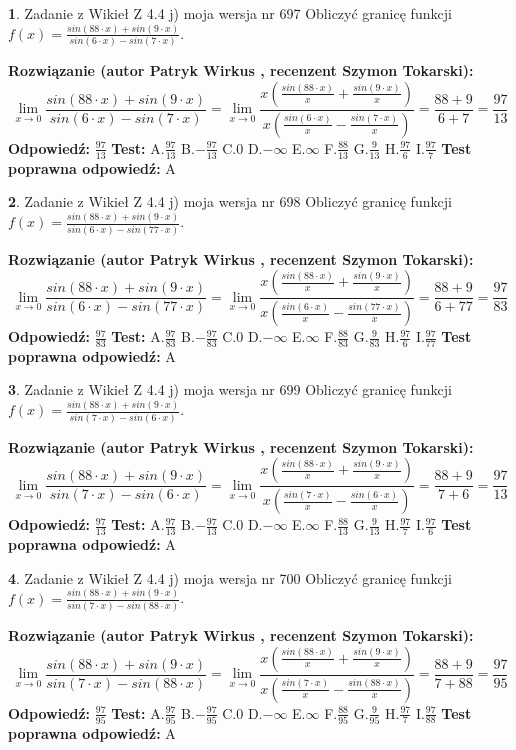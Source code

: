 \documentclass[12pt, a4paper]{article}
\theoremstyle{definition} %
\newtheorem{zad}{}
\newcommand{\zadStart}[1]{\begin{zad}#1\newline}
\newcommand{\zadStop}{\end{zad}}
\newcommand{\rozwStart}[2]{\noindent \textbf{Rozwiązanie (autor #1 , recenzent #2): }\newline}
\newcommand{\rozwStop}{\newline}
\newcommand{\odpStart}{\noindent \textbf{Odpowiedź:}\newline}
\newcommand{\odpStop}{\newline}
\newcommand{\testStart}{\noindent \textbf{Test:}\newline}
\newcommand{\testStop}{\newline}
\newcommand{\kluczStart}{\noindent \textbf{Test poprawna odpowiedź:}\newline}
\newcommand{\kluczStop}{\newline}
\begin{document}
\zadStart{Zadanie z Wikieł Z 4.4 j) moja wersja nr 697}
Obliczyć granicę funkcji $f(x)=\frac{sin(88\cdot x) +sin(9\cdot x)}{sin(6\cdot x) -sin(7\cdot x)}$.
\zadStop
\rozwStart{Patryk Wirkus}{Szymon Tokarski}
$$\lim\limits_{x\to 0}\frac{sin(88\cdot x) +sin(9\cdot x)}{sin(6\cdot x) -sin(7\cdot x)}=\lim\limits_{x\to 0}\frac{x(\frac{sin(88\cdot x)}{x}+\frac{sin(9\cdot x)}{x})}{x(\frac{sin(6\cdot x)}{x}-\frac{sin(7\cdot x)}{x})}=\frac{88+9}{6+7} = \frac{97}{13}$$
\rozwStop
\odpStart
$\frac{97}{13}$
\odpStop
\testStart
A.$\frac{97}{13}$
B.$-\frac{97}{13}$
C.$0$
D.$-\infty$
E.$\infty$
F.$\frac{88}{13}$
G.$\frac{9}{13}$
H.$\frac{97}{6}$
I.$\frac{97}{7}$
\testStop
\kluczStart
A
\kluczStop



\zadStart{Zadanie z Wikieł Z 4.4 j) moja wersja nr 698}
Obliczyć granicę funkcji $f(x)=\frac{sin(88\cdot x) +sin(9\cdot x)}{sin(6\cdot x) -sin(77\cdot x)}$.
\zadStop
\rozwStart{Patryk Wirkus}{Szymon Tokarski}
$$\lim\limits_{x\to 0}\frac{sin(88\cdot x) +sin(9\cdot x)}{sin(6\cdot x) -sin(77\cdot x)}=\lim\limits_{x\to 0}\frac{x(\frac{sin(88\cdot x)}{x}+\frac{sin(9\cdot x)}{x})}{x(\frac{sin(6\cdot x)}{x}-\frac{sin(77\cdot x)}{x})}=\frac{88+9}{6+77} = \frac{97}{83}$$
\rozwStop
\odpStart
$\frac{97}{83}$
\odpStop
\testStart
A.$\frac{97}{83}$
B.$-\frac{97}{83}$
C.$0$
D.$-\infty$
E.$\infty$
F.$\frac{88}{83}$
G.$\frac{9}{83}$
H.$\frac{97}{6}$
I.$\frac{97}{77}$
\testStop
\kluczStart
A
\kluczStop



\zadStart{Zadanie z Wikieł Z 4.4 j) moja wersja nr 699}
Obliczyć granicę funkcji $f(x)=\frac{sin(88\cdot x) +sin(9\cdot x)}{sin(7\cdot x) -sin(6\cdot x)}$.
\zadStop
\rozwStart{Patryk Wirkus}{Szymon Tokarski}
$$\lim\limits_{x\to 0}\frac{sin(88\cdot x) +sin(9\cdot x)}{sin(7\cdot x) -sin(6\cdot x)}=\lim\limits_{x\to 0}\frac{x(\frac{sin(88\cdot x)}{x}+\frac{sin(9\cdot x)}{x})}{x(\frac{sin(7\cdot x)}{x}-\frac{sin(6\cdot x)}{x})}=\frac{88+9}{7+6} = \frac{97}{13}$$
\rozwStop
\odpStart
$\frac{97}{13}$
\odpStop
\testStart
A.$\frac{97}{13}$
B.$-\frac{97}{13}$
C.$0$
D.$-\infty$
E.$\infty$
F.$\frac{88}{13}$
G.$\frac{9}{13}$
H.$\frac{97}{7}$
I.$\frac{97}{6}$
\testStop
\kluczStart
A
\kluczStop



\zadStart{Zadanie z Wikieł Z 4.4 j) moja wersja nr 700}
Obliczyć granicę funkcji $f(x)=\frac{sin(88\cdot x) +sin(9\cdot x)}{sin(7\cdot x) -sin(88\cdot x)}$.
\zadStop
\rozwStart{Patryk Wirkus}{Szymon Tokarski}
$$\lim\limits_{x\to 0}\frac{sin(88\cdot x) +sin(9\cdot x)}{sin(7\cdot x) -sin(88\cdot x)}=\lim\limits_{x\to 0}\frac{x(\frac{sin(88\cdot x)}{x}+\frac{sin(9\cdot x)}{x})}{x(\frac{sin(7\cdot x)}{x}-\frac{sin(88\cdot x)}{x})}=\frac{88+9}{7+88} = \frac{97}{95}$$
\rozwStop
\odpStart
$\frac{97}{95}$
\odpStop
\testStart
A.$\frac{97}{95}$
B.$-\frac{97}{95}$
C.$0$
D.$-\infty$
E.$\infty$
F.$\frac{88}{95}$
G.$\frac{9}{95}$
H.$\frac{97}{7}$
I.$\frac{97}{88}$
\testStop
\kluczStart
A
\kluczStop
\end{document}
